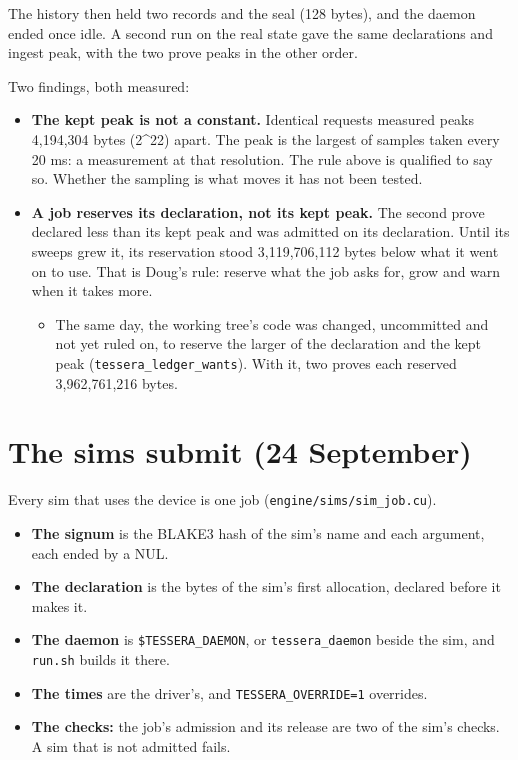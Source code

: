 The history then held two records and the seal (128 bytes), and the daemon ended once idle. A second run on the real state gave the same declarations and ingest peak, with the two prove peaks in the other order.

Two findings, both measured:

\begin{itemize}
\item \textbf{The kept peak is not a constant.} Identical requests measured peaks 4,194,304 bytes (2\textasciicircum{}22) apart. The peak is the largest of samples taken every 20 ms: a measurement at that resolution. The rule above is qualified to say so. Whether the sampling is what moves it has not been tested.
\item \textbf{A job reserves its declaration, not its kept peak.} The second prove declared less than its kept peak and was admitted on its declaration. Until its sweeps grew it, its reservation stood 3,119,706,112 bytes below what it went on to use. That is Doug's rule: reserve what the job asks for, grow and warn when it takes more.

\begin{itemize}
\item The same day, the working tree's code was changed, uncommitted and not yet ruled on, to reserve the larger of the declaration and the kept peak (\texttt{tessera\_\allowbreak{}ledger\_\allowbreak{}wants}). With it, two proves each reserved 3,962,761,216 bytes.
\end{itemize}
\end{itemize}

\section{\texorpdfstring{The sims submit (24 September)}{The sims submit (24 September)}}

Every sim that uses the device is one job (\texttt{engine/\allowbreak{}sims/\allowbreak{}sim\_\allowbreak{}job.\allowbreak{}cu}).

\begin{itemize}
\item \textbf{The signum} is the BLAKE3 hash of the sim's name and each argument, each ended by a NUL.
\item \textbf{The declaration} is the bytes of the sim's first allocation, declared before it makes it.
\item \textbf{The daemon} is \texttt{\$TESSERA\_\allowbreak{}DAEMON}, or \texttt{tessera\_\allowbreak{}daemon} beside the sim, and \texttt{run.\allowbreak{}sh} builds it there.
\item \textbf{The times} are the driver's, and \texttt{TESSERA\_\allowbreak{}OVERRIDE=1} overrides.
\item \textbf{The checks:} the job's admission and its release are two of the sim's checks. A sim that is not admitted fails.
\end{itemize}

